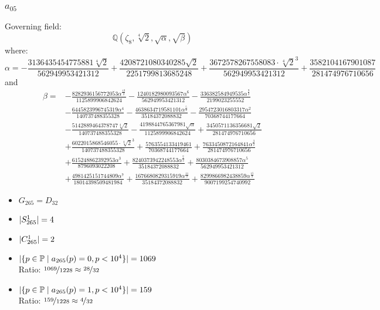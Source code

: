\subsubsection{$a_{05}$}
Governing field:
$$\mathbb{Q}\left(\zeta_8, \sqrt[4]{2}, \sqrt{\alpha}, \sqrt{\beta}\right)$$
where:
$$\alpha = - \frac{3136435454775881 \sqrt[4]{2}}{562949953421312} + \frac{4208721080340285 \sqrt{2}}{2251799813685248} + \frac{3672578267558083 \cdot \sqrt[4]{2}^3}{562949953421312} + \frac{3582104167901087}{281474976710656}$$
and
\begin{align*}
\beta = 
&- \frac{8282936156772053 \alpha^{\frac{13}{2}}}{1125899906842624} 
- \frac{1240182980093567 \alpha^{6}}{562949953421312} 
- \frac{336382584949535 \alpha^{\frac{9}{2}}}{2199023255552} 
\\
&- \frac{6445823996745319 \alpha^{4}}{140737488355328} 
- \frac{4638634719581101 \alpha^{\frac{5}{2}}}{35184372088832} 
- \frac{2954723016803317 \alpha^{2}}{70368744177664} 
\\
&- \frac{5142889464378747 \sqrt[4]{2}}{140737488355328} 
- \frac{4198844765367981 \sqrt{\alpha}}{1125899906842624} 
+ \frac{3450571136356681 \sqrt{2}}{281474976710656} 
\\
&+ \frac{6022015868546055 \cdot \sqrt[4]{2}^3}{140737488355328} 
+ \frac{5763554133419461}{70368744177664} 
+ \frac{7633450872164841 \alpha^{\frac{3}{2}}}{281474976710656} 
\\
&+ \frac{615248862392953 \alpha^{3}}{8796093022208} 
+ \frac{8240373942248553 \alpha^{\frac{7}{2}}}{35184372088832} 
+ \frac{8030384673908857 \alpha^{5}}{562949953421312} 
\\
&+ \frac{4981425151744809 \alpha^{7}}{18014398509481984} 
+ \frac{1676680829315919 \alpha^{\frac{11}{2}}}{35184372088832} 
+ \frac{8299866982438859 \alpha^{\frac{15}{2}}}{9007199254740992}
\end{align*}
\begin{multicols}{2}
	\begin{itemize}
		\item $G_{265} = D_{32}$
		\item $| S_{265}^1 | = 4$
		\item $| C_{265}^1 | = 2$
	\end{itemize}
	\begin{itemize}
		\item $| \{ p \in \mathbb{P} \mid a_{265}(p)=0, p<10^4 \} | = 1069$\\
		Ratio: $\nicefrac{ 1069 }{ 1228 } \approx \nicefrac{ 28 }{ 32 }$
		\item $| \{ p \in \mathbb{P} \mid a_{265}(p)=1, p<10^4 \} | = 159$\\
		Ratio: $\nicefrac{ 159 }{ 1228 } \approx \nicefrac{ 4 }{ 32 }$
	\end{itemize}
\end{multicols}

